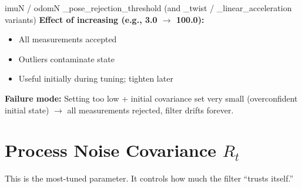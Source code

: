 \documentclass[11pt,a4paper]{article}
\begin{document}
\begin{paramcard}{imuN / odomN \_pose\_rejection\_threshold (and \_twist / \_linear\_acceleration variants)}
\textbf{Effect of increasing (e.g., 3.0 $\to$ 100.0):}
\begin{itemize}
\item All measurements accepted
\item Outliers contaminate state
\item Useful initially during tuning; tighten later
\end{itemize}

\textbf{Failure mode:} Setting too low + initial covariance set very small (overconfident initial state) $\to$ all measurements rejected, filter drifts forever.
\end{paramcard}

\section{Process Noise Covariance $R_t$}

This is the most-tuned parameter. It controls how much the filter ``trusts itself.''
\end{document}

